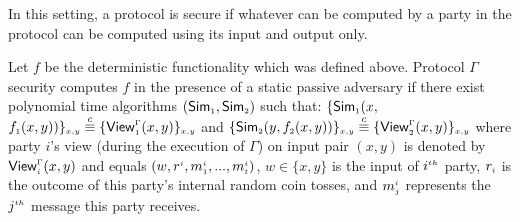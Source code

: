   
In this setting, a protocol is secure if whatever can be computed by a party in the protocol can be computed using its input and output only. 
 
 \vspace{-1mm}
 
\begin{definition}
Let $f$ be the deterministic functionality which was defined above. Protocol $\Gamma$ security computes $f$ in the presence of a static  passive adversary if there exist polynomial time algorithms $(\mathsf {Sim}_{\scriptscriptstyle 1}, \mathsf {Sim}_{\scriptscriptstyle 2})$ such that: 
%
{\small{
$
  \{\mathsf {Sim}_{\scriptscriptstyle 1}(x, $ $f_{\scriptscriptstyle 1}(x,y))\}_{\scriptscriptstyle x,y}\\\stackrel{c}{\equiv} \{\mathsf{View}_{\scriptscriptstyle 1}^{\scriptscriptstyle \Gamma}(x,y) \}_{\scriptscriptstyle x,y}$ and 
     $\{\mathsf{Sim}_{\scriptscriptstyle 2}(y, f_{\scriptscriptstyle 2}(x,y))\}_{\scriptscriptstyle x,y}\stackrel{c}{\equiv} \{\mathsf{View}_{\scriptscriptstyle 2}^{\scriptscriptstyle \Gamma}(x,y) \}_{\scriptscriptstyle x,y}
$}}
  where party $i$’s view (during the execution of $\Gamma$) on input pair  $(x, y)$ is denoted by $\mathsf{View}_{\scriptscriptstyle i}^{\scriptscriptstyle \Gamma}(x,y)$ and equals $(w, r^{\scriptscriptstyle i}, m_{\scriptscriptstyle 1}^{\scriptscriptstyle i}, ..., m_{\scriptscriptstyle t}^{\scriptscriptstyle i})$, $w\in\{x,y\}$ is the input of $i^{\scriptscriptstyle th}$ party, $r_{\scriptscriptstyle i}$ is the outcome of this party's internal random coin tosses, and $m_{\scriptscriptstyle j}^{\scriptscriptstyle i}$ represents the $j^{\scriptscriptstyle th}$ message this party receives.  %
%
  \vspace{-3mm}
\end{definition}
 

